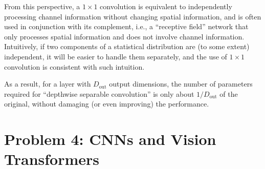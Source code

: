 \documentclass[11pt, a4paper, oneside]{memoir}
\begin{document}
From this perspective, a $1 \times 1$ convolution is equivalent to independently processing channel information without changing spatial information,
and is often used in conjunction with its complement, i.e., a ``receptive field'' network that only processes spatial information and does not involve channel information.
Intuitively, if two components of a statistical distribution are (to some extent) independent, it will be easier to handle them separately,
and the use of $1 \times 1$ convolution is consistent with such intuition.

As a result, for a layer with $D_{\text{out}}$ output dimensions,
the number of parameters required for ``depthwise separable convolution'' is only about $1/D_{\text{out}}$ of the original,
without damaging (or even improving) the performance.

\chapter{Problem 4: CNNs and Vision Transformers}
\end{document}
